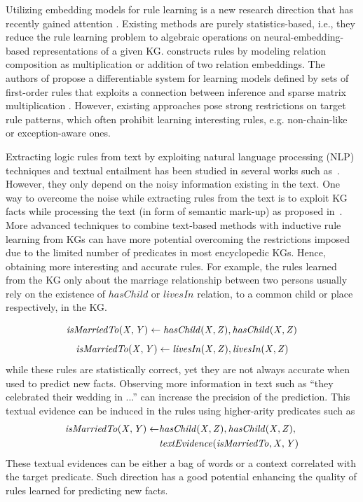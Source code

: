  Utilizing embedding models for rule learning is a new research direction that has recently gained attention \cite{DBLP:conf/nips/YangYC17,DBLP:journals/corr/YangYHGD14a}. Existing methods are purely statistics-based, i.e., they reduce the rule learning problem to algebraic operations on neural-embedding-based representations of a given KG.  \cite{DBLP:journals/corr/YangYHGD14a} constructs rules by modeling relation composition as multiplication or addition of two relation embeddings. The authors of \cite{DBLP:conf/nips/YangYC17} propose a differentiable system for learning models defined by sets of first-order rules that exploits a connection between inference and sparse matrix multiplication \cite{DBLP:journals/corr/Cohen16b}. However, existing approaches pose strong restrictions on target rule patterns, which often prohibit learning interesting rules, e.g. non-chain-like or exception-aware ones.


  Extracting logic rules from text by exploiting natural language processing (NLP) techniques and textual entailment has been studied in several works such as~\cite{Schoenmackers:2010,Gordon:2011,dragoni2016}. However, they only depend on the noisy information existing in the text. One way to overcome the noise while extracting rules from the text is to exploit KG facts while processing the text (\ie in form of semantic mark-up) as proposed in~\cite{Aitken2002}. More advanced techniques to combine 
text-based methods with inductive rule learning from KGs %
can have more potential  
 overcoming the restrictions imposed due to the limited number of predicates in most encyclopedic KGs. Hence, obtaining more interesting and accurate rules. For example, the rules learned from the KG only about the marriage relationship between two persons usually rely on the existence of $hasChild$ or $livesIn$ relation, to a common child or place respectively, in the KG.

 \[ \mathit{isMarriedTo(X,Y)} \leftarrow \mathit{hasChild(X,Z),hasChild(X,Z)}\]
 \[\mathit{isMarriedTo(X,Y)} \leftarrow \mathit{livesIn(X,Z),livesIn(X,Z)}\]
while these rules are statistically correct, yet they are not always accurate when used to predict new facts. Observing more information in text such as ``they celebrated their wedding in ...'' can increase the precision of the prediction.  This textual evidence can be induced in the rules using higher-arity predicates such as  
\begin{align*}
 \mathit{isMarriedTo(X,Y)} \leftarrow &\mathit{hasChild(X,Z),hasChild(X,Z)},\\ &\mathit{textEvidence(isMarriedTo,X,Y)}
\end{align*}
These textual evidences can be either a bag of words or a context correlated with the target predicate. Such direction has a good potential enhancing the quality of rules learned for predicting new facts.

